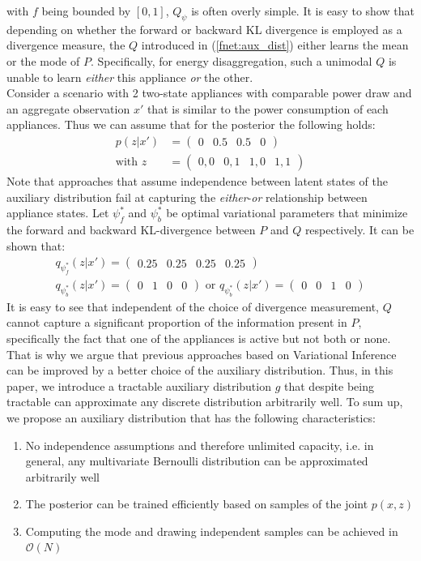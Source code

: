 with $f$ being bounded by $[0,1]$, $Q_\psi$ is often overly simple. It is easy to show that depending on whether the forward or backward KL divergence is employed as a divergence measure, the $Q$ introduced in (\ref{fnet:aux_dist}) either learns the mean or the mode of $P$. Specifically, for energy disaggregation, such a unimodal $Q$ is unable to learn \emph{either} this appliance \emph{or} the other.\\
Consider a scenario with 2 two-state appliances with comparable power draw and an aggregate observation $x'$ that is similar to the power consumption of each appliances. Thus we can assume that for the posterior the following holds:
\begin{align*}
p(z|x') &= \begin{pmatrix}
0&
0.5&
0.5&
0
\end{pmatrix}\\
 \text{with } z &=\begin{pmatrix} 0,0&
0,1 &
1,0 &
1,1 
\end{pmatrix}
\end{align*} Note that approaches that assume independence between latent states of the auxiliary distribution fail at capturing the \emph{either}-\emph{or} relationship between appliance states. Let $\psi^*_f$ and $\psi^*_b$ be optimal variational parameters that minimize the forward and backward KL-divergence between $P$ and $Q$ respectively. It can be shown that: 
\begin{align*}
q_{\psi^*_f}(z|x') = \begin{pmatrix}
0.25 &
0.25 &
0.25 &
0.25 
\end{pmatrix}\\
q_{\psi^*_b}(z|x') = \begin{pmatrix}
0 &
1 &
0 &
0 
\end{pmatrix}
\text{ or }
q_{\psi^*_b}(z|x') = \begin{pmatrix}
0 &
0 &
1 &
0 
\end{pmatrix}
\end{align*}
It is easy to see that independent of the choice of divergence measurement, $Q$ cannot capture a significant proportion of the information present in $P$, specifically the fact that one of the appliances is active but not both or none.\\
That is why we argue that previous approaches based on Variational Inference can be improved by a better choice of the auxiliary distribution. Thus, in this paper, we introduce a tractable auxiliary distribution $g$ that despite being tractable can approximate any discrete distribution arbitrarily well. To sum up, we propose an auxiliary distribution that has the following characteristics:
\begin{enumerate}
\item No independence assumptions and therefore unlimited capacity, i.e. in general, any multivariate Bernoulli distribution can be approximated arbitrarily well
\item The posterior can be trained efficiently based on samples of the joint $p(x,z)$
\item Computing the mode and drawing independent samples can be achieved in $\mathcal{O}(N)$
\end{enumerate}

